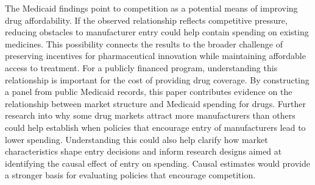The Medicaid findings point to competition as a potential means of improving drug affordability. If the observed relationship reflects competitive pressure, reducing obstacles to manufacturer entry could help contain spending on existing medicines. This possibility connects the results to the broader challenge of preserving incentives for pharmaceutical innovation while maintaining affordable access to treatment. For a publicly financed program, understanding this relationship is important for the cost of providing drug coverage. By constructing a panel from public Medicaid records, this paper contributes evidence on the relationship between market structure and Medicaid spending for drugs. Further research into why some drug markets attract more manufacturers than others could help establish when policies that encourage entry of manufacturers lead to lower spending. Understanding this could also help clarify how market characteristics shape entry decisions and inform research designs aimed at identifying the causal effect of entry on spending. Causal estimates would provide a stronger basis for evaluating policies that encourage competition.

